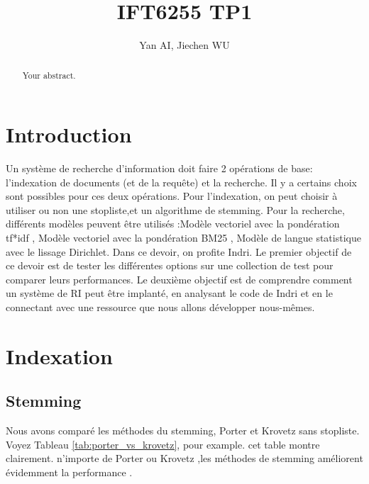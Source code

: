 \documentclass[a4paper]{article}
\title{IFT6255 TP1}
\author{Yan AI, Jiechen WU}
\begin{document}
\maketitle

\begin{abstract}
Your abstract.
\end{abstract}

\section{Introduction}
Un système de recherche d’information doit faire 2 opérations de base: l’indexation de documents (et de la requête) et la recherche. 
Il y a certains choix sont possibles pour ces deux opérations. 
Pour l’indexation, on peut choisir à utiliser ou non une stopliste,et un algorithme de stemming.
Pour la recherche, différents modèles peuvent être utilisés :Modèle vectoriel avec la pondération tf*idf , Modèle vectoriel avec la pondération BM25 , Modèle de langue statistique avec le lissage Dirichlet.
 Dans ce devoir,  on profite Indri.  
 Le premier objectif de ce devoir est de tester les différentes options sur une collection de test pour comparer leurs performances. 
 Le deuxième objectif est de comprendre comment un système de RI peut être implanté, en analysant le code de Indri et en le connectant avec une ressource que nous allons  développer nous-mêmes.




\section{Indexation}

\subsection{Stemming}
Nous avons comparé les méthodes du stemming, Porter et Krovetz sans stopliste. Voyez Tableau \ref{tab:porter_vs_krovetz}, pour example. 
cet table montre clairement. n'importe de Porter ou Krovetz ,les méthodes de stemming améliorent évidemment la performance .
\end{document}
